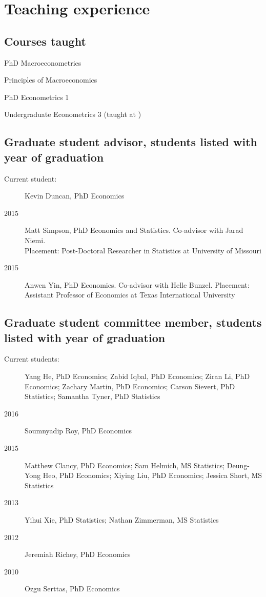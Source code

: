 \documentclass[12pt]{article}%
\newcommand{\allcaps}[1]{\textls{\MakeUppercase{#1}}}
\newcommand{\p}{\rlap{.}}
\begin{document}
\section*{Teaching experience}

\subsection*{Courses taught}
\begin{description}[noitemsep]
\item[2011--present] PhD Macroeconometrics
\item[2010--present] Principles of Macroeconomics
\item[2009--present] PhD Econometrics 1
\item[2009\p] Undergraduate Econometrics 3 (taught at \allcaps{UCSD})
\end{description}

\subsection*{Graduate student advisor, students listed with year of graduation}
\begin{description}
\item[Current student:] Kevin Duncan, PhD Economics
\item[2015] Matt Simpson, PhD Economics and Statistics.  Co-advisor
with Jarad Niemi.\\
Placement: Post-Doctoral Researcher in Statistics at University of Missouri
\item[2015] Anwen Yin, PhD Economics. Co-advisor with Helle Bunzel.
Placement: Assistant Professor of Economics at Texas 
International University
\end{description}

\subsection*{Graduate student committee member, students listed with year of graduation}

\begin{description}
\item[Current students:]
Yang He, PhD Economics;
Zabid Iqbal, PhD Economics;
Ziran Li, PhD Economics;
Zachary Martin, PhD Economics;
Carson Sievert, PhD Statistics;
Samantha Tyner, PhD Statistics
\item[2016]
Soumnyadip Roy, PhD Economics
\item[2015]
Matthew Clancy, PhD Economics;
Sam Helmich, MS Statistics;
Deung-Yong Heo, PhD Economics;
Xiying Liu, PhD Economics;
Jessica Short, MS Statistics
\item[2013]
Yihui Xie, PhD Statistics;
Nathan Zimmerman, MS Statistics
\item[2012] Jeremiah Richey, PhD Economics
\item[2010] Ozgu Serttas, PhD Economics
\end{description}
\end{document}
